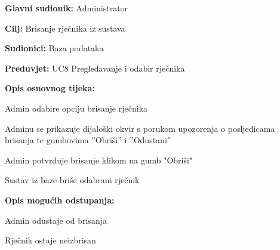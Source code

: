 \noindent {}
\begin{packed_item}

	\item \textbf{Glavni sudionik:} Administrator
	\item  \textbf{Cilj:} Brisanje rječnika iz sustava
	\item  \textbf{Sudionici:} Baza podataka
	\item  \textbf{Preduvjet:} UC8 Pregledavanje i odabir rječnika
	\item  \textbf{Opis osnovnog tijeka:}
	
	\item[] \begin{packed_enum}

		\item Admin odabire opciju brisanje rječnika
		\item Adminu se prikazuje dijaloški okvir s porukom upozorenja o posljedicama brisanja te gumbovima ”Obriši” i ”Odustani”
		\item Admin potvrđuje brisanje klikom na gumb "Obriši"
		\item Sustav iz baze briše odabrani rječnik
		
	\end{packed_enum}

	\item  \textbf{Opis mogućih odstupanja:}
	
	\item[] \begin{packed_item}

		\item[3.a] Admin odustaje od brisanja
		\item[] \begin{packed_enum}
			
			\item Rječnik ostaje neizbrisan
			
		\end{packed_enum}
		
	\end{packed_item}

\end{packed_item}


